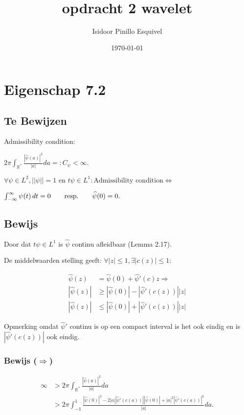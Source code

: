 \documentclass{article}
\title{opdracht 2 wavelet}
\author{Isidoor Pinillo Esquivel}
\date{\today}
\begin{document}
\maketitle

\section{Eigenschap 7.2}

\subsection{Te Bewijzen}

Admissibility condition:

$2\pi\int_{\mathbb{R}^*}{\frac{|\widehat{\psi}(a)|^{2}}{|a|}}da=:C_{\psi}<\infty.$

$\forall \psi \in L^{2}, ||\psi|| =1 \text{ en } t \psi \in L^{1}: \text{Admissibility condition} \Leftrightarrow $

$\int_{-\infty}^{\infty}\psi(t)\,dt=0\qquad\mathrm{resp.}\qquad\widehat{\psi}(0)=0\\ .
$

\subsection{Bewijs}

Door dat $t \psi \in L^{1}$ is $\widehat{\psi}$ continu afleidbaar (Lemma 2.17).

De middelwaarden stelling geeft: $\forall |z|\le 1,\exists |c(z)|\le 1 :$

\begin{align*}
    \widehat{\psi}(z)   & = \widehat{\psi}(0)+\widehat{\psi}'(c) z \Rightarrow  \\
    |\widehat{\psi}(z)| & \ge |\widehat{\psi}(0)| - |\widehat{\psi}'(c(z)) ||z| \\
    |\widehat{\psi}(z)| & \le |\widehat{\psi}(0)| + |\widehat{\psi}'(c(z)) ||z|
\end{align*}

Opmerking omdat $\widehat{\psi}'$ continu is op een compact interval is het ook eindig en is $|\widehat{\psi}'(c(z)) |$ ook eindig.

\subsubsection{Bewijs ($\Rightarrow$)}

\begin{align*}
    \infty & > 2 \pi \int_{\mathbb{R}^*} \frac{|\widehat{\psi}(a)|^{2} }{|a|} da                                                                                     \\
           & > 2 \pi \int_{-1}^{1} \frac{|\widehat{\psi}(0)|^{2} - 2 |a| |\widehat{\psi}'(c(a))||\widehat{\psi}(0)| + |a|^{2} |\widehat{\psi}'(c(a))|^{2} }{|a|} da.
\end{align*}
\end{document}
